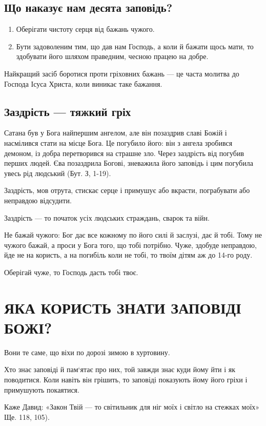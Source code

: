 \documentclass[main.tex]{subfiles}
\begin{document}
\subsection{Що наказує нам десята заповідь?}

\begin{enumerate}
    \item Оберігати чистоту серця від бажань чужого.
    \item Бути задоволеним тим, що дав нам Господь, а коли й бажати щось мати, то здобувати його шляхом праведним, чесною працею на добре.
\end{enumerate}

Найкращий засіб боротися проти гріховних бажань — це часта молитва до Господа Ісуса Христа, коли виникає таке бажання.

\subsection{Заздрість — тяжкий гріх}

Сатана був у Бога найпершим ангелом, але він позаздрив славі Божій і насмілився стати на місце Бога. Це погубило його: він з ангела зробився демоном, із добра перетворився на страшне зло. Через заздрість від погубив перших людей. Єва позаздрила Богові, зневажила його заповідь і цим погубила увесь рід людський (Бут. З, 1-19).
 
Заздрість, мов отрута, стискає серце і примушує або вкрасти, пограбувати або неправдою відсудити.

Заздрість — то початок усіх людських страждань, сварок та війн.

Не бажай чужого: Бог дає все кожному по його силі й заслузі, дає й тобі. Тому не чужого бажай, а проси у Бога того, що тобі потрібно. Чуже, здобуде неправдою, йде не на користь, а на погибіль коли не тобі, то твоїм дітям аж до 14-го роду.

Оберігай чуже, то Господь дасть тобі твоє.

\section{ЯКА КОРИСТЬ ЗНАТИ ЗАПОВІДІ БОЖІ?}

Вони те саме, що віхи по дорозі зимою в хуртовину.

Хто знає заповіді й пам`ятає про них, той завжди знає куди йому йти і як поводитися. Коли навіть він грішить, то заповіді показують йому його гріхи і примушують покаятися.

Каже Давид: «Закон Твій — то світильник для ніг моїх і світло на стежках моїх» Ще. 118, 105).
\end{document}
